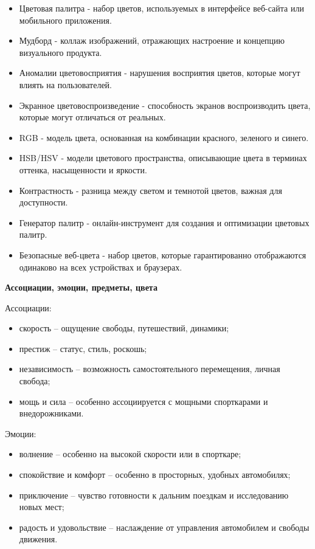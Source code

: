 \begin{itemize}
    \item Цветовая палитра - набор цветов, используемых в интерфейсе веб-сайта или мобильного приложения.
    \item Мудборд - коллаж изображений, отражающих настроение и концепцию визуального продукта.
    \item Аномалии цветовосприятия - нарушения восприятия цветов, которые могут влиять на пользователей.
    \item Экранное цветовоспроизведение - способность экранов воспроизводить цвета, которые могут отличаться от реальных.
    \item RGB - модель цвета, основанная на комбинации красного, зеленого и синего.
    \item HSB/HSV - модели цветового пространства, описывающие цвета в терминах оттенка, насыщенности и яркости.
    \item Контрастность - разница между светом и темнотой цветов, важная для доступности.
    \item Генератор палитр - онлайн-инструмент для создания и оптимизации цветовых палитр.
    \item Безопасные веб-цвета - набор цветов, которые гарантированно отображаются одинаково на всех устройствах и браузерах.
\end{itemize}
\bigskip

\textbf{Ассоциации, эмоции, предметы, цвета}
\bigskip

Ассоциации:
\begin{itemize}
    \item скорость – ощущение свободы, путешествий, динамики;
    \item престиж – статус, стиль, роскошь;
    \item независимость – возможность самостоятельного перемещения, личная свобода;
    \item мощь и сила – особенно ассоциируется с мощными спорткарами и внедорожниками.
\end{itemize}
\bigskip

Эмоции:
\begin{itemize}
    \item волнение – особенно на высокой скорости или в спорткаре;
    \item спокойствие и комфорт – особенно в просторных, удобных автомобилях;
    \item приключение – чувство готовности к дальним поездкам и исследованию новых мест;
    \item радость и удовольствие – наслаждение от управления автомобилем и свободы движения.
\end{itemize}
\bigskip

